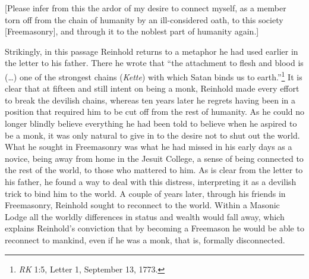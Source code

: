 [Please infer from this the ardor of my desire to connect myself, as a member torn off from the chain of humanity by an ill{-}considered oath, to this society [Freemasonry], and through it to the noblest part of humanity again.]

Strikingly, in this passage Reinhold returns to a metaphor he had used earlier in the letter to his father. There he wrote that ``the attachment to flesh and blood is (\ldots ) one of the strongest chains (\textit{Kette}) with which Satan binds us to earth.''\footnote{ \textit{RK} 1:5, Letter 1, September 13, 1773. } It is clear that at fifteen and still intent on being a monk, Reinhold made every effort to break the devilish chains, whereas ten years later he regrets having been in a position that required him to be cut off from the rest of humanity. As he could no longer blindly believe everything he had been told to believe when he aspired to be a monk, it was only natural to give in to the desire not to shut out the world. What he sought in Freemasonry was what he had missed in his early days as a novice, being away from home in the Jesuit College, a sense of being connected to the rest of the world, to those who mattered to him. As is clear from the letter to his father, he found a way to deal with this distress, interpreting it as a devilish trick to bind him to the world. A couple of years later, through his friends in Freemasonry, Reinhold sought to reconnect to the world. Within a Masonic Lodge all the worldly differences in status and wealth would fall away, which explains Reinhold's conviction that by becoming a Freemason he would be able to reconnect to mankind, even if he was a monk, that is, formally disconnected.


